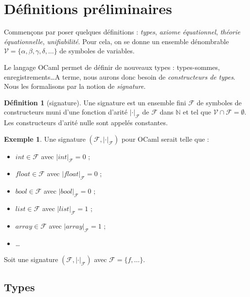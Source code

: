\documentclass[a4paper]{report}
\theoremstyle{definition}
\newtheorem{definition}[theoreme]{Définition}
\newtheorem{exemple}[theoreme]{Exemple}
\newcommand{\V}{\mathscr{V}}
\newcommand{\F}{\mathscr{F}}
\begin{document}

\section{Définitions préliminaires}

Commençons par poser quelques définitions : \emph{types}, \emph{axiome équationnel}, \emph{théorie équationnelle}, \emph{unifiabilité}. Pour cela, on se donne un ensemble dénombrable $\V = \{ \alpha, \beta, \gamma, \delta, \dots \}$ de symboles de variables.

Le langage OCaml permet de définir de nouveaux types : types-sommes, enregistrements\dots A terme, nous aurons donc besoin de \emph{constructeurs de types}. Nous les formalisons par la notion de \emph{signature}.

\begin{definition}[signature]
	Une signature est un ensemble fini $\F$ de symboles de constructeurs muni d'une fonction d'arité $| \cdot |_\F$ de $\F$ dans $\mathbb{N}$ et tel que $\V \cap \F = \emptyset$. Les constructeurs d'arité nulle sont appelés constantes.
\end{definition}

\begin{exemple}
	Une signature $( \F, | \cdot |_\F )$ pour OCaml serait telle que :
	\begin{itemize}
		\item $int \in \F$ avec $| int |_\F = 0$ ;
		\item $float \in \F$ avec $| float |_\F = 0$ ;
		\item $bool \in \F$ avec $| bool |_\F = 0$ ;
		\item $list \in \F$ avec $| list |_\F = 1$ ;
		\item $array \in \F$ avec $| array |_\F = 1$ ;
		\item \dots
	\end{itemize}
\end{exemple}

Soit une signature $( \F, | \cdot |_\F )$ avec $\F = \{ f, \dots \}$.


\subsection{Types}
\end{document}
